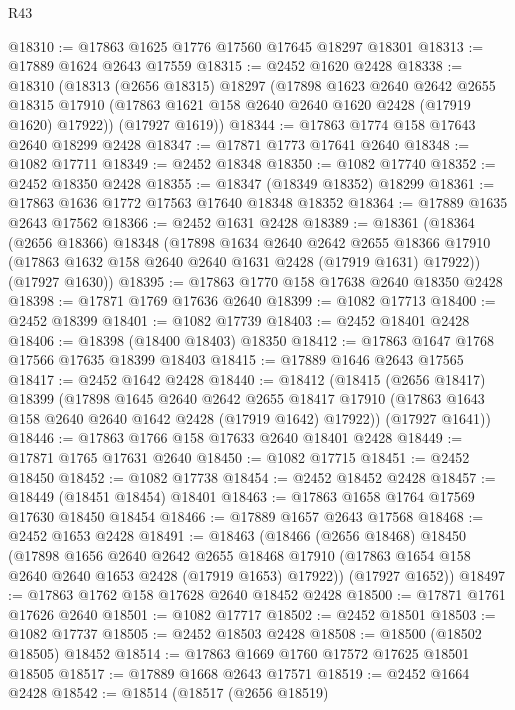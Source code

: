 \begin{lexlean}{R43}
\begin{coremodule}
@18310 := @17863 @1625 @1776 @17560 @17645 @18297 @18301
@18313 := @17889 @1624 @2643 @17559
@18315 := @2452 @1620 @2428
@18338 := @18310
    (@18313
      (@2656 @18315)
      @18297
      (@17898
        @1623
        @2640
        @2642
        @2655
        @18315
        @17910
        (@17863 @1621 @158 @2640 @2640 @1620 @2428 (@17919 @1620) @17922))
      (@17927 @1619))
@18344 := @17863 @1774 @158 @17643 @2640 @18299 @2428
@18347 := @17871 @1773 @17641 @2640
@18348 := @1082 @17711
@18349 := @2452 @18348
@18350 := @1082 @17740
@18352 := @2452 @18350 @2428
@18355 := @18347 (@18349 @18352) @18299
@18361 := @17863 @1636 @1772 @17563 @17640 @18348 @18352
@18364 := @17889 @1635 @2643 @17562
@18366 := @2452 @1631 @2428
@18389 := @18361
    (@18364
      (@2656 @18366)
      @18348
      (@17898
        @1634
        @2640
        @2642
        @2655
        @18366
        @17910
        (@17863 @1632 @158 @2640 @2640 @1631 @2428 (@17919 @1631) @17922))
      (@17927 @1630))
@18395 := @17863 @1770 @158 @17638 @2640 @18350 @2428
@18398 := @17871 @1769 @17636 @2640
@18399 := @1082 @17713
@18400 := @2452 @18399
@18401 := @1082 @17739
@18403 := @2452 @18401 @2428
@18406 := @18398 (@18400 @18403) @18350
@18412 := @17863 @1647 @1768 @17566 @17635 @18399 @18403
@18415 := @17889 @1646 @2643 @17565
@18417 := @2452 @1642 @2428
@18440 := @18412
    (@18415
      (@2656 @18417)
      @18399
      (@17898
        @1645
        @2640
        @2642
        @2655
        @18417
        @17910
        (@17863 @1643 @158 @2640 @2640 @1642 @2428 (@17919 @1642) @17922))
      (@17927 @1641))
@18446 := @17863 @1766 @158 @17633 @2640 @18401 @2428
@18449 := @17871 @1765 @17631 @2640
@18450 := @1082 @17715
@18451 := @2452 @18450
@18452 := @1082 @17738
@18454 := @2452 @18452 @2428
@18457 := @18449 (@18451 @18454) @18401
@18463 := @17863 @1658 @1764 @17569 @17630 @18450 @18454
@18466 := @17889 @1657 @2643 @17568
@18468 := @2452 @1653 @2428
@18491 := @18463
    (@18466
      (@2656 @18468)
      @18450
      (@17898
        @1656
        @2640
        @2642
        @2655
        @18468
        @17910
        (@17863 @1654 @158 @2640 @2640 @1653 @2428 (@17919 @1653) @17922))
      (@17927 @1652))
@18497 := @17863 @1762 @158 @17628 @2640 @18452 @2428
@18500 := @17871 @1761 @17626 @2640
@18501 := @1082 @17717
@18502 := @2452 @18501
@18503 := @1082 @17737
@18505 := @2452 @18503 @2428
@18508 := @18500 (@18502 @18505) @18452
@18514 := @17863 @1669 @1760 @17572 @17625 @18501 @18505
@18517 := @17889 @1668 @2643 @17571
@18519 := @2452 @1664 @2428
@18542 := @18514
    (@18517
      (@2656 @18519)

\end{coremodule}
\end{lexlean}
